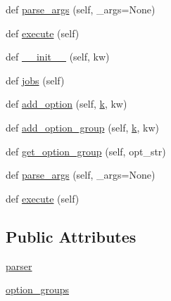 \begin{DoxyCompactItemize}
\item 
def \hyperlink{classwaflib_1_1_options_1_1_options_context_a752b6da27459ab6ab321b9ba4a51794b}{parse\+\_\+args} (self, \+\_\+args=None)
\item 
def \hyperlink{classwaflib_1_1_options_1_1_options_context_a96c2ec435bdfb92055d5eba068f8a74c}{execute} (self)
\item 
def \hyperlink{classwaflib_1_1_options_1_1_options_context_a7528362c0445246253c2897bb25c8cbe}{\+\_\+\+\_\+init\+\_\+\+\_\+} (self, kw)
\item 
def \hyperlink{classwaflib_1_1_options_1_1_options_context_a0187065321be14244835020d432e0d2d}{jobs} (self)
\item 
def \hyperlink{classwaflib_1_1_options_1_1_options_context_a967bd812f590a35d725f9ecb841e8c73}{add\+\_\+option} (self, \hyperlink{rfft2d_test_m_l_8m_adc468c70fb574ebd07287b38d0d0676d}{k}, kw)
\item 
def \hyperlink{classwaflib_1_1_options_1_1_options_context_ab80e21095bb29c6d3c5916b1ca5a2a55}{add\+\_\+option\+\_\+group} (self, \hyperlink{rfft2d_test_m_l_8m_adc468c70fb574ebd07287b38d0d0676d}{k}, kw)
\item 
def \hyperlink{classwaflib_1_1_options_1_1_options_context_a836995808c3fb9bdfe4328726e7dbdca}{get\+\_\+option\+\_\+group} (self, opt\+\_\+str)
\item 
def \hyperlink{classwaflib_1_1_options_1_1_options_context_a752b6da27459ab6ab321b9ba4a51794b}{parse\+\_\+args} (self, \+\_\+args=None)
\item 
def \hyperlink{classwaflib_1_1_options_1_1_options_context_a96c2ec435bdfb92055d5eba068f8a74c}{execute} (self)
\end{DoxyCompactItemize}
\subsection*{Public Attributes}
\begin{DoxyCompactItemize}
\item 
\hyperlink{classwaflib_1_1_options_1_1_options_context_ab0b0a70ff279d9095a304f9c0fb2a095}{parser}
\item 
\hyperlink{classwaflib_1_1_options_1_1_options_context_a164c4353e025d250379721ee8bed0760}{option\+\_\+groups}
\end{DoxyCompactItemize}

